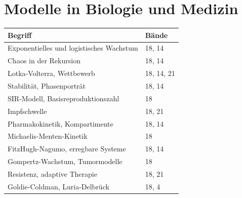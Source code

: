 \section*{Modelle in Biologie und Medizin}
\nopagebreak
{\small\renewcommand{\arraystretch}{1.32}
\begin{longtable}{@{}P{5.6cm}P{2.8cm}@{}}
\toprule
\textbf{Begriff} & \textbf{Bände}\\
\midrule
\endhead
Exponentielles und logistisches Wachstum & 18, 14\\
Chaos in der Rekursion & 18, 14\\
Lotka-Volterra, Wettbewerb & 18, 14, 21\\
Stabilität, Phasenporträt & 18, 14\\
SIR-Modell, Basisreproduktionszahl & 18\\
Impfschwelle & 18, 21\\
Pharmakokinetik, Kompartimente & 18, 14\\
Michaelis-Menten-Kinetik & 18\\
FitzHugh-Nagumo, erregbare Systeme & 18, 14\\
Gompertz-Wachstum, Tumormodelle & 18\\
Resistenz, adaptive Therapie & 18, 21\\
Goldie-Coldman, Luria-Delbrück & 18, 4\\
\bottomrule
\end{longtable}}

